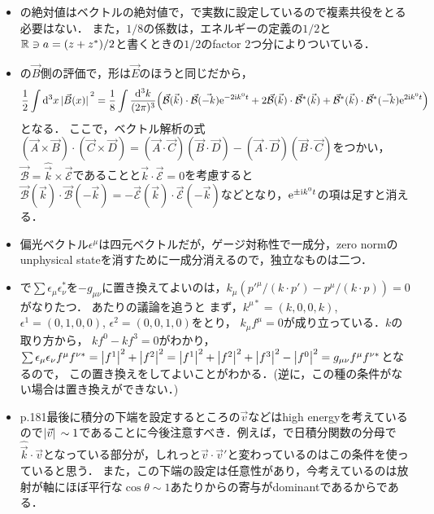 \begin{itemize}
	\item {}の絶対値はベクトルの絶対値で，で実数に設定しているので複素共役をとる必要はない．
	また，$1/8$の係数は，エネルギーの定義の$1/2$と$\mathbb{R}\ni a = (z+z^*)/2$と書くときの$1/2$のfactor 2つ分によりついている．

	\item {}の$\vec{B}$側の評価で，形は$\vec{E}$のほうと同じだから，
	\begin{equation}
		\frac{1}{2}\int\dd[3]{x}\abs*{\vec{B}(x)}^2
		= \frac{1}{8}\int \frac{\dd[3]{k}}{(2\pi)^{3}}
		\qty(\vec{\mathcal{B}}(\vec{k})\cdot \vec{\mathcal{B}}(\vec{-k})\mathrm{e}^{-2\mathrm{i} k^0t}
		+ 2\vec{\mathcal{B}}(\vec{k}) \cdot \vec{\mathcal{B}}^{*}(\vec{k})
		+ \vec{\mathcal{B}}^{*}(\vec{k}) \cdot \vec{\mathcal{B}}^{*}(\vec{-k})\mathrm{e}^{2\mathrm{i} k^0t})
	\end{equation} 
	となる．
	ここで，ベクトル解析の式$(\vec{A}\times\vec{B})\cdot(\vec{C}\times \vec{D}) = (\vec{A}\cdot \vec{C})(\vec{B}\cdot \vec{D}) - (\vec{A}\cdot\vec{D})(\vec{B}\cdot \vec{C})$をつかい，$\vec{\mathcal{B}} = \hat{\vec{k}} \times \vec{\mathcal{E}}$であることと$\vec{k} \cdot \vec{\mathcal{E}} = 0$を考慮すると$\vec{\mathcal{B}}(\vec{k})\cdot\vec{\mathcal{B}}(-\vec{k}) = -\vec{\mathcal{E}}(\vec{k})\cdot\vec{\mathcal{E}}(-\vec{k})$などとなり，$\mathrm{e}^{\pm \mathrm{i} k^0t}$の項は足すと消える．

	\item 偏光ベクトル$\epsilon^{\mu}$は四元ベクトルだが，ゲージ対称性で一成分，zero normのunphysical stateを消すために一成分消えるので，独立なものは二つ．
	\item {}で$\sum \epsilon_\mu\epsilon_\nu^{*}$を$-g_{\mu\nu}$に置き換えてよいのは，$k_{\mu}(p'^{\mu}/(k\cdot p') - p^{\mu}/(k\cdot p)) = 0$がなりたつ．
	あたりの議論を追うと
	まず，$k^{\mu*} = (k, 0,0, k)$, $\epsilon^1 = (0, 1, 0, 0)$, $\epsilon^2 = (0, 0, 1, 0)$をとり，
	$k_{\mu}f^{\mu} = 0 $が成り立っている．$k$の取り方から，
	$kf^0 - kf^3 = 0$がわかり，
	$\sum \epsilon_\mu\epsilon_\nu f^\mu f^{\nu *} = \abs{f^1}^2 + \abs{f^2}^2 = \abs{f^1}^2 + \abs{f^2}^2 + \abs{f^3}^2 - \abs{f^0}^2 = g_{\mu\nu}f^{\mu}f^{\nu * }$となるので，
	この置き換えをしてよいことがわかる．(逆に，この種の条件がない場合は置き換えができない．)
	

	\item p.181最後に積分の下端を設定するところの$\vec{v}$などはhigh energyを考えているので$\abs*{\vec{v}} \sim 1$であることに今後注意すべき．例えば，で日積分関数の分母で$\hat{\vec{k}}\cdot \vec{v}$となっている部分が，しれっと$\vec{v}\cdot \vec{v}'$と変わっているのはこの条件を使っていると思う．
	また，この下端の設定は任意性があり，今考えているのは放射が軸にほぼ平行な$\cos\theta \sim 1$あたりからの寄与がdominantであるからである．


\end{itemize}

